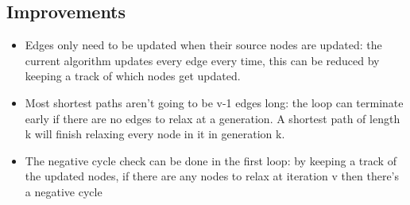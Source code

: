 \subsection{Improvements}
\begin{itemize}
    \item Edges only need to be updated when their source nodes are updated: the current algorithm updates every edge every time, this can be reduced by keeping a track of which nodes get updated. 
    \item Most shortest paths aren't going to be v-1 edges long: the loop can terminate early if there are no edges to relax at a generation. A shortest path of length k will finish relaxing every node in it in generation k.
    \item The negative cycle check can be done in the first loop: by keeping a track of the updated nodes, if there are any nodes to relax at iteration v then there's a negative cycle
\end{itemize}


